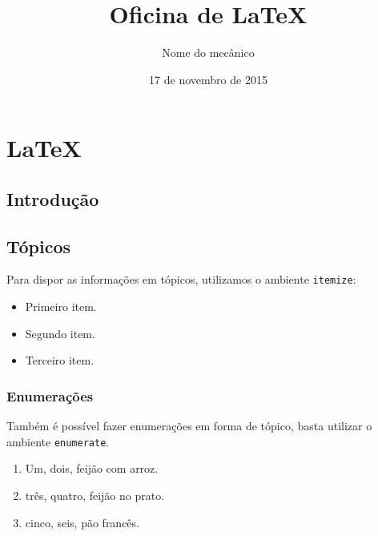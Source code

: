 \documentclass{book}
\author{Nome do mecânico} %
\date{17 de novembro de 2015} %
\title{Oficina de \LaTeX} %
\begin{document}
\maketitle %
\tableofcontents 

\chapter{\LaTeX}
\section{Introdução}
\lipsum[3]
\section{Tópicos}
Para dispor as informações em tópicos, utilizamos o ambiente {\tt itemize}:
\begin{itemize}
	\item Primeiro item.
	\item Segundo item.
	\item Terceiro item.
\end{itemize}

\subsection{Enumerações}

Também é possível fazer enumerações em forma de tópico, basta utilizar o ambiente {\tt enumerate}.
\begin{enumerate}
	\item Um, dois, feijão com arroz.
	\item três, quatro, feijão no prato.
	\item cinco, seis, pão francês.
\end{enumerate}
\end{document}
